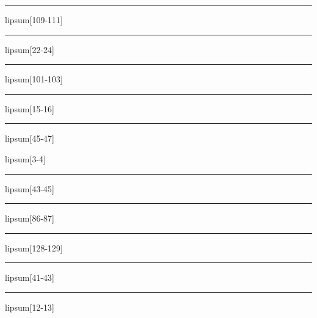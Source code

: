 \documentclass[11pt,a4paper]{article}
\begin{document}
\begin{simplewrap}
  \textcolor{blue!60}{\rule{4.2cm}{4.3cm}}
\end{simplewrap}
lipsum[109-111]

\begin{simplewrap}
  \textcolor{green!50}{\rule{4.6cm}{6.9cm}}
\end{simplewrap}
lipsum[22-24]

\begin{simplewrap}
  \textcolor{cyan!23}{\rule{5.9cm}{3.2cm}}
\end{simplewrap}
lipsum[101-103]

\begin{simplewrap}
  \textcolor{green!29}{\rule{5.1cm}{7.8cm}}
\end{simplewrap}
lipsum[15-16]

\begin{simplewrap}
  \textcolor{olive!17}{\rule{4.4cm}{6.9cm}}
\end{simplewrap}
lipsum[45-47]

lipsum[3-4]

\begin{simplewrap}
  \textcolor{cyan!41}{\rule{5.9cm}{6.2cm}}
\end{simplewrap}
lipsum[43-45]

\begin{simplewrap}
  \textcolor{teal!56}{\rule{5.7cm}{8.2cm}}
\end{simplewrap}
lipsum[86-87]

\begin{simplewrap}
  \textcolor{teal!43}{\rule{3.2cm}{7.7cm}}
\end{simplewrap}
lipsum[128-129]

\begin{simplewrap}
  \textcolor{lime!13}{\rule{4.5cm}{6.5cm}}
\end{simplewrap}
lipsum[41-43]

\begin{simplewrap}
  \textcolor{orange!46}{\rule{5.0cm}{2.9cm}}
\end{simplewrap}
lipsum[12-13]
\end{document}
